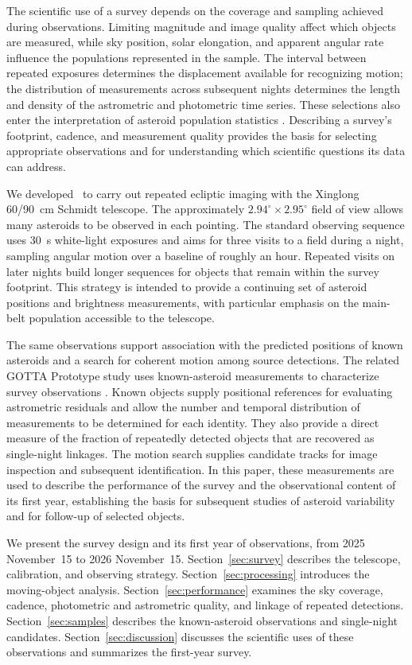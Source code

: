 The scientific use of a survey depends on the coverage and sampling
achieved during observations. Limiting magnitude and image quality affect
which objects are measured, while sky position, solar elongation, and
apparent angular rate influence the populations represented in the
sample. The interval between repeated exposures determines the
displacement available for recognizing motion; the distribution of
measurements across subsequent nights determines the length and density
of the astrometric and photometric time series. These selections also
enter the interpretation of asteroid population statistics
\citep{Jedicke2015Surveys}. Describing a survey's footprint, cadence, and
measurement quality provides the basis for selecting appropriate
observations and for understanding which scientific questions its data
can address.

We developed \SHARP\ to carry out repeated ecliptic imaging with the
Xinglong 60/90~cm Schmidt telescope. The approximately
$2.94^\circ\times2.95^\circ$ field of view allows many asteroids to be
observed in each pointing. The standard observing sequence uses 30~s
white-light exposures and aims for three visits to a field during a night,
sampling angular motion over a baseline of roughly an hour. Repeated
visits on later nights build longer sequences for objects that remain
within the survey footprint. This strategy is intended to provide a
continuing set of asteroid positions and brightness measurements, with
particular emphasis on the main-belt population accessible to the
telescope.

The same observations support association with the predicted positions of
known asteroids and a search for coherent motion among source detections.
The related GOTTA Prototype study uses known-asteroid measurements to
characterize survey observations \citep[in preparation]{Xiao2026InPrep}.
Known objects supply positional references for evaluating astrometric
residuals and allow the number and temporal distribution of measurements
to be determined for each identity. They also provide a direct measure of
the fraction of repeatedly detected objects that are recovered as
single-night linkages. The motion search supplies candidate tracks for
image inspection and subsequent identification. In this paper, these
measurements are used to describe the performance of the survey and the
observational content of its first year, establishing the basis for
subsequent studies of asteroid variability and for follow-up of selected
objects.

We present the survey design and its first year of observations, from
2025 November~15 to 2026 November~15. Section~\ref{sec:survey} describes the telescope,
calibration, and observing strategy. Section~\ref{sec:processing}
introduces the moving-object analysis. Section~\ref{sec:performance}
examines the sky coverage, cadence, photometric and astrometric quality,
and linkage of repeated detections. Section~\ref{sec:samples} describes
the known-asteroid observations and single-night candidates.
Section~\ref{sec:discussion} discusses the scientific uses of these
observations and summarizes the first-year survey.
